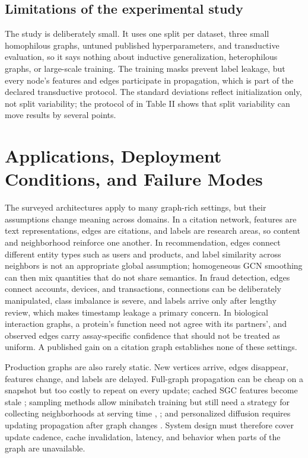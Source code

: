 \documentclass[conference]{IEEEtran}
\begin{document}
\subsection{Limitations of the experimental study}

The study is deliberately small. It uses one split per dataset, three small homophilous graphs, untuned published hyperparameters, and transductive evaluation, so it says nothing about inductive generalization, heterophilous graphs, or large-scale training. The training masks prevent label leakage, but every node's features and edges participate in propagation, which is part of the declared transductive protocol. The standard deviations reflect initialization only, not split variability; the protocol of \cite{b6} in Table II shows that split variability can move results by several points.

\section{Applications, Deployment Conditions, and Failure Modes}

The surveyed architectures apply to many graph-rich settings, but their assumptions change meaning across domains. In a citation network, features are text representations, edges are citations, and labels are research areas, so content and neighborhood reinforce one another. In recommendation, edges connect different entity types such as users and products, and label similarity across neighbors is not an appropriate global assumption; homogeneous GCN smoothing can then mix quantities that do not share semantics. In fraud detection, edges connect accounts, devices, and transactions, connections can be deliberately manipulated, class imbalance is severe, and labels arrive only after lengthy review, which makes timestamp leakage a primary concern. In biological interaction graphs, a protein's function need not agree with its partners', and observed edges carry assay-specific confidence that should not be treated as uniform. A published gain on a citation graph establishes none of these settings.

Production graphs are also rarely static. New vertices arrive, edges disappear, features change, and labels are delayed. Full-graph propagation can be cheap on a snapshot but too costly to repeat on every update; cached SGC features become stale \cite{b5}; sampling methods allow minibatch training but still need a strategy for collecting neighborhoods at serving time \cite{b2}, \cite{b8}; and personalized diffusion requires updating propagation after graph changes \cite{b6}. System design must therefore cover update cadence, cache invalidation, latency, and behavior when parts of the graph are unavailable.
\end{document}
